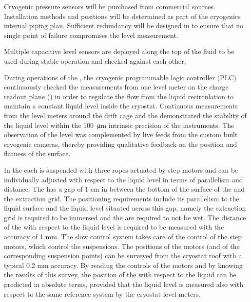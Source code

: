 Cryogenic pressure sensors will be purchased from commercial sources.
Installation methods and positions will be determined as part of the
cryogenics internal piping plan.  Sufficient redundancy will be designed in
to ensure that no single point of failure compromises the level measurement.

Multiple capacitive level sensors are deployed along the top of
the fluid to be used during stable operation and checked against each
other.

During operations of the , the cryogenic programmable logic controller (PLC) continuously checked the measurements from one level meter on the charge readout plane () in order to regulate the flow from the liquid recirculation to maintain a constant liquid level inside the cryostat. Continuous measurements from the level meters around the drift cage and the  demonstrated the stability of the liquid level within the \SI{100}{\micro\meter} intrinsic precision of the instruments. The observation of the level was complemented by live feeds from the custom built cryogenic cameras, thereby providing qualitative feedback on the position and flatness of the surface.

 In the  each  is suspended with three ropes actuated by step motors and can be individually adjusted with respect to the liquid level in terms of parallelism and distance. The  has a gap of 1 cm in between the bottom of the surface of the  and the extraction grid. The  positioning requirements include its parallelism to the liquid surface and the liquid level situated across this gap, namely the extraction grid is required to be immersed and the  are required to not be wet.  The distance of the  with respect to the liquid level is required to be measured with the accuracy of 1 mm. The slow control system takes care of the control of the step motors, which control the  suspensions. The positions of the motors (and of the corresponding suspension points) can be surveyed from the cryostat roof with a typical 0.2 mm accuracy. By reading the controls of the motors and by knowing the results of this survey, the position of the  with respect to the liquid can be predicted in absolute terms, provided that the liquid level is measured also with respect to the same reference system by the cryostat level meters. 
 
